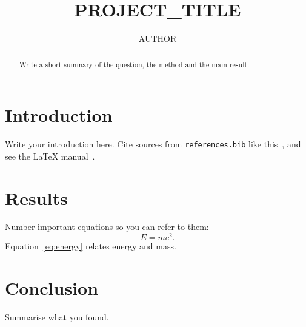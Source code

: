 \documentclass[sigconf,nonacm]{acmart}
\begin{document}
\title{{{PROJECT_TITLE}}}
\author{{{AUTHOR}}}

\begin{abstract}
Write a short summary of the question, the method and the main result.
\end{abstract}


\maketitle

\section{Introduction}
Write your introduction here. Cite sources from \texttt{references.bib} like
this~\cite{einstein1905}, and see the \LaTeX{} manual~\cite{lamport1994}.

\section{Results}
Number important equations so you can refer to them:
\begin{equation}
  E = mc^2 . \label{eq:energy}
\end{equation}
Equation~\eqref{eq:energy} relates energy and mass.

\section{Conclusion}
Summarise what you found.



\end{document}
